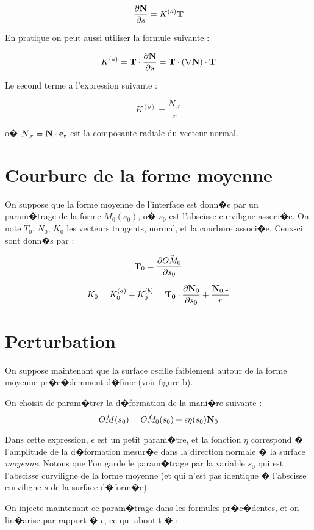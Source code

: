 \documentclass{jfm}
\newcommand\DP[2]{\frac{\partial #1}{\partial #2}}
\begin{document}
$$
\DP{{\bf N}}{s} = K^{(a)} {\bf T}
$$

En pratique on peut aussi utiliser la formule suivante :

$$
K^{(a)} =  {\bf T} \cdot \DP{{\bf N}}{s} =   {\bf T} \cdot (\nabla {\bf N}) \cdot {\bf T} 
$$


Le second terme a l'expression suivante :

$$
K^{(b)} =  \frac{ N_{,r}}{r}
$$

o� $N_{,r} = {\bf N} \cdot {\bf e_r}$ est la composante radiale du vecteur normal.

\section{Courbure de la forme moyenne}

On suppose que la forme moyenne de l'interface est donn�e par un param�trage de la forme $M_0(s_0)$, o� $s_0$ est l'abscisse curviligne associ�e. On note $T_0$, $N_0$, $K_0$ les vecteurs tangents, normal, et la courbure associ�e. Ceux-ci sont donn�s par :

$$
{\bf T}_0 = \DP{\vec{OM_0}}{s_0}
$$


\begin{equation}
K_0 = K_0^{(a)} + K_0^{(b)} =  {\bf T_0} \cdot \DP{{\bf N}_0}{s_0} 
+ \frac{{\bf N}_{0,r}}{r}
\end{equation}

\section{Perturbation}

On suppose maintenant que la surface oscille faiblement autour de la forme moyenne pr�c�demment d�finie (voir figure b).

On choisit de param�trer la d�formation de la mani�re suivante :
$$
\vec{OM}(s_0)  = \vec{OM_0}(s_0) + \epsilon \eta(s_0) {\bf N}_0
$$

Dans cette expression, $\epsilon$ est un petit param�tre, et la fonction $\eta$ correspond � l'amplitude de la d�formation mesur�e dans la direction normale � la surface {\em moyenne}. Notons 
que l'on garde le param�trage par la variable $s_0$ qui est l'abscisse curviligne de la forme moyenne 
(et qui n'est pas identique � l'abscisse curviligne $s$ de la surface d�form�e).

On injecte maintenant ce param�trage dans les formules pr�c�dentes, et on lin�arise par rapport � 
$\epsilon$, ce qui aboutit � : 
\end{document}
